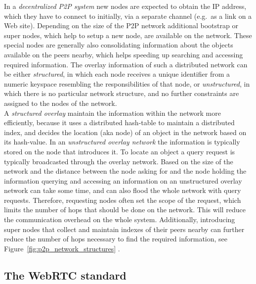 In a \emph{decentralized \gls{P2P} system} new nodes are expected to obtain the \gls{IP} address, which they have to connect to initially, via a separate channel (e.g.\ as a link on a Web site). Depending on the size of the \gls{P2P} network additional bootstrap or super nodes, which help to setup a new node, are available on the network. These special nodes are generally also consolidating information about the objects available on the peers nearby, which helps speeding up searching and accessing required information. The overlay information of such a distributed network can be either \emph{structured}, in which each node receives a unique identifier from a numeric keyspace resembling the responsibilities of that node, or \emph{unstructured}, in which there is no particular network structure, and no further constraints are assigned to the nodes of the network. \\

A \emph{structured overlay} maintain the information within the network more efficiently, because it uses a distributed hash-table to maintain a distributed index, and decides the location (aka node) of an object in the network based on its hash-value. In an \emph{unstructured overlay network} the information is typically stored on the node that introduces it. To locate an object a query request is typically broadcasted through the overlay network. Based on the size of the network and the distance between the node asking for and the node holding the information querying and accessing an information on an unstructured overlay network can take some time, and can also flood the whole network with query requests. Therefore, requesting nodes often set the scope of the request, which limits the number of hops that should be done on the network. This will reduce the communication overhead on the whole system. Additionally, introducing super nodes that collect and maintain indexes of their peers nearby can further reduce the number of hops necessary to find the required information, see Figure~\ref{fig:p2p_network_structures} \citep{rodrigues2010peer}. \@


\subsection{The \gls{WebRTC} standard}
\label{sec:p2p_webrtc}

